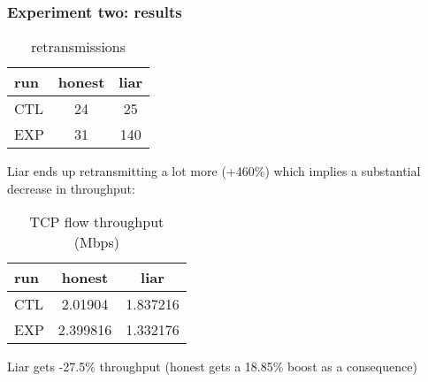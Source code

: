 \begin{frame}
\frametitle{Experiment two: results}

\begin{center}
  \begin{table}
    \begin{tabular}{l | c | c }
      run & honest & liar \\
      \hline \hline
      CTL & 24 & 25\\ 
      EXP & 31 & 140\\
    \end{tabular}
    \caption{retransmissions}
  \end{table}
\end{center}

Liar ends up retransmitting a lot more (+460\%) which implies a substantial decrease in throughput:

\begin{center}
  \begin{table}
    \begin{tabular}{l | c | c }
      run & honest & liar \\
      \hline \hline
      CTL & 2.01904 & 1.837216\\ 
      EXP & 2.399816 & 1.332176\\
    \end{tabular}
    \caption{TCP flow throughput (Mbps)}
  \end{table}
\end{center}

Liar gets -27.5\% throughput (honest gets a 18.85\% boost as a consequence)

\end{frame}
